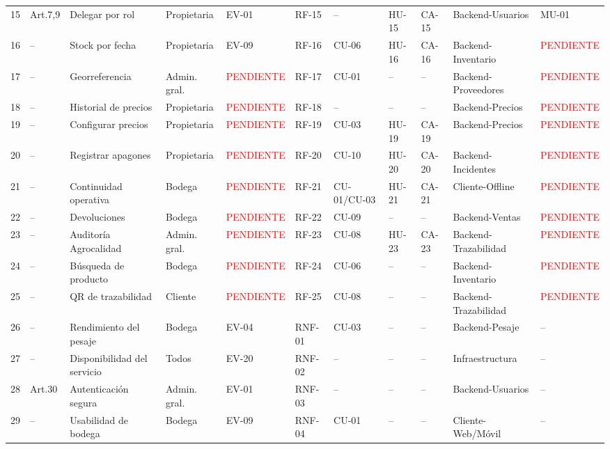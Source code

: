 \documentclass[11pt,a4paper]{article}
\begin{document}
\begin{longtable}{|p{0.6cm}|p{1.6cm}|p{2.3cm}|p{1.7cm}|p{0.9cm}|p{0.9cm}|p{0.9cm}|p{0.9cm}|p{0.9cm}|p{1.5cm}|p{1.1cm}|}
15 & Art.7,9 & Delegar por rol & Propietaria & EV-01 & RF-15 & -- & HU-15 & CA-15 & Backend-Usuarios & MU-01 \\
16 & -- & Stock por fecha & Propietaria & EV-09 & RF-16 & CU-06 & HU-16 & CA-16 & Backend-Inventario & \textcolor{red}{PENDIENTE} \\
17 & -- & Georreferencia & Admin. gral. & \textcolor{red}{PENDIENTE} & RF-17 & CU-01 & -- & -- & Backend-Proveedores & \textcolor{red}{PENDIENTE} \\
18 & -- & Historial de precios & Propietaria & \textcolor{red}{PENDIENTE} & RF-18 & -- & -- & -- & Backend-Precios & \textcolor{red}{PENDIENTE} \\
19 & -- & Configurar precios & Propietaria & \textcolor{red}{PENDIENTE} & RF-19 & CU-03 & HU-19 & CA-19 & Backend-Precios & \textcolor{red}{PENDIENTE} \\
20 & -- & Registrar apagones & Propietaria & \textcolor{red}{PENDIENTE} & RF-20 & CU-10 & HU-20 & CA-20 & Backend-Incidentes & \textcolor{red}{PENDIENTE} \\
21 & -- & Continuidad operativa & Bodega & \textcolor{red}{PENDIENTE} & RF-21 & CU-01/CU-03 & HU-21 & CA-21 & Cliente-Offline & \textcolor{red}{PENDIENTE} \\
22 & -- & Devoluciones & Bodega & \textcolor{red}{PENDIENTE} & RF-22 & CU-09 & -- & -- & Backend-Ventas & \textcolor{red}{PENDIENTE} \\
23 & -- & Auditoría Agrocalidad & Admin. gral. & \textcolor{red}{PENDIENTE} & RF-23 & CU-08 & HU-23 & CA-23 & Backend-Trazabilidad & \textcolor{red}{PENDIENTE} \\
24 & -- & Búsqueda de producto & Bodega & \textcolor{red}{PENDIENTE} & RF-24 & CU-06 & -- & -- & Backend-Inventario & \textcolor{red}{PENDIENTE} \\
25 & -- & QR de trazabilidad & Cliente & \textcolor{red}{PENDIENTE} & RF-25 & CU-08 & -- & -- & Backend-Trazabilidad & \textcolor{red}{PENDIENTE} \\
26 & -- & Rendimiento del pesaje & Bodega & EV-04 & RNF-01 & CU-03 & -- & -- & Backend-Pesaje & -- \\
27 & -- & Disponibilidad del servicio & Todos & EV-20 & RNF-02 & -- & -- & -- & Infraestructura & -- \\
28 & Art.30 & Autenticación segura & Admin. gral. & EV-01 & RNF-03 & -- & -- & -- & Backend-Usuarios & -- \\
29 & -- & Usabilidad de bodega & Bodega & EV-09 & RNF-04 & CU-01 & -- & -- & Cliente-Web/Móvil & -- \\

\end{longtable}
\end{document}
